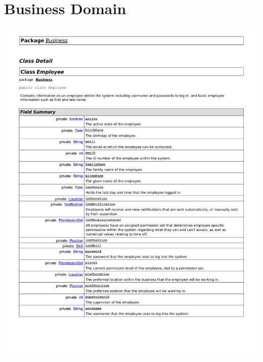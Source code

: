 \documentclass[letterpaper,12pt]{report}
\begin{document}
\section{Business Domain}
\includegraphics[scale=0.9,trim=10mm 30mm 25mm 10mm]{externals/db1.pdf}
\newpage
\end{document}
